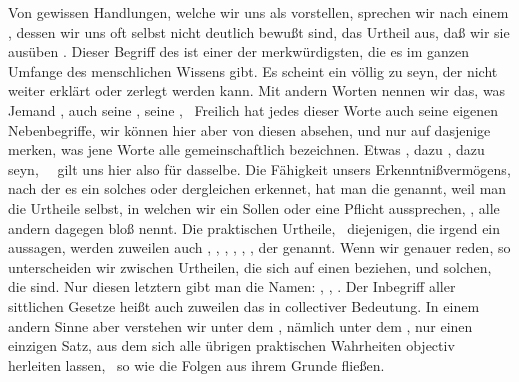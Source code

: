 \begin{aufza}
\item Von gewissen Handlungen, welche wir uns als  vorstellen, sprechen wir nach einem , dessen wir uns oft selbst nicht deutlich bewußt sind, das Urtheil aus, daß wir sie ausüben . Dieser Begriff des  ist einer der merkwürdigsten, die es im ganzen Umfange des menschlichen Wissens gibt. Es scheint ein völlig  zu seyn, der nicht weiter erklärt oder zerlegt werden kann. Mit andern Worten nennen wir das, was Jemand , auch seine , seine ,  \usf\ Freilich hat jedes dieser Worte auch seine eigenen Nebenbegriffe, wir können hier aber von diesen absehen, und nur auf dasjenige merken, was jene Worte alle gemeinschaftlich bezeichnen. Etwas , dazu , dazu  seyn, \usw~\ gilt uns hier also für dasselbe. Die Fähigkeit unsers Erkenntnißvermögens, nach der es ein solches  oder dergleichen  erkennet, hat man die  genannt, weil man die Urtheile selbst, in welchen wir ein Sollen oder eine Pflicht aussprechen, , alle andern dagegen bloß  nennt. Die praktischen Urtheile, \dh\ diejenigen, die irgend ein  aussagen, werden zuweilen auch , , , , , ,  der  genannt. Wenn wir genauer reden, so unterscheiden wir zwischen Urtheilen, die sich auf einen  beziehen, und solchen, die  sind. Nur diesen letztern gibt man die Namen: , , . Der Inbegriff aller sittlichen Gesetze heißt auch zuweilen das  in collectiver Bedeutung. In einem andern Sinne aber verstehen wir unter dem , nämlich unter dem , nur einen einzigen Satz, aus dem sich alle übrigen praktischen Wahrheiten objectiv herleiten lassen, \dh\ so wie die Folgen aus ihrem Grunde fließen.

\end{aufza}
